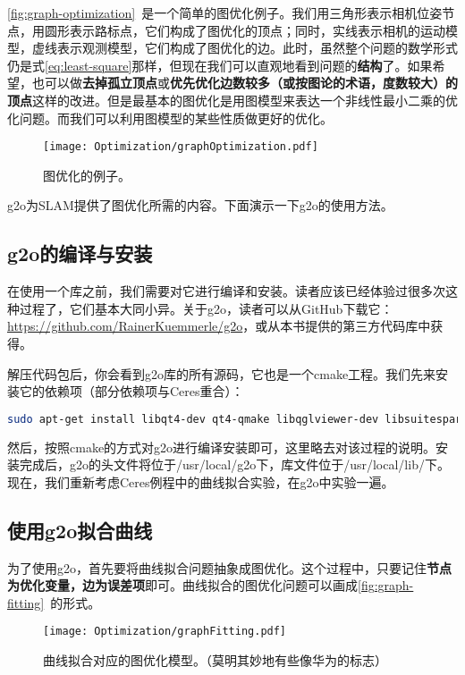 \autoref{fig:graph-optimization}~是一个简单的图优化例子。我们用三角形表示相机位姿节点，用圆形表示路标点，它们构成了图优化的顶点；同时，实线表示相机的运动模型，虚线表示观测模型，它们构成了图优化的边。此时，虽然整个问题的数学形式仍是式\eqref{eq:least-square}那样，但现在我们可以直观地看到问题的\textbf{结构}了。如果希望，也可以做\textbf{去掉孤立顶点}或\textbf{优先优化边数较多（或按图论的术语，度数较大）的顶点}这样的改进。但是最基本的图优化是用图模型来表达一个非线性最小二乘的优化问题。而我们可以利用图模型的某些性质做更好的优化。

\begin{figure}[!ht]
	\centering
	\texttt{[image: Optimization/graphOptimization.pdf]}
	\caption{图优化的例子。}
	\label{fig:graph-optimization}
\end{figure}

g2o为SLAM提供了图优化所需的内容。下面演示一下g2o的使用方法。

\subsection{g2o的编译与安装}
在使用一个库之前，我们需要对它进行编译和安装。读者应该已经体验过很多次这种过程了，它们基本大同小异。关于g2o，读者可以从GitHub下载它：\url{https://github.com/RainerKuemmerle/g2o}，或从本书提供的第三方代码库中获得。

解压代码包后，你会看到g2o库的所有源码，它也是一个cmake工程。我们先来安装它的依赖项（部分依赖项与Ceres重合）：

\begin{lstlisting}[language=sh]
sudo apt-get install libqt4-dev qt4-qmake libqglviewer-dev libsuitesparse-dev libcxsparse3.1.2 libcholmod-dev
\end{lstlisting}

然后，按照cmake的方式对g2o进行编译安装即可，这里略去对该过程的说明。安装完成后，g2o的头文件将位于/usr/local/g2o下，库文件位于/usr/local/lib/下。现在，我们重新考虑Ceres例程中的曲线拟合实验，在g2o中实验一遍。

\clearpage

\subsection{使用g2o拟合曲线}
为了使用g2o，首先要将曲线拟合问题抽象成图优化。这个过程中，只要记住\textbf{节点为优化变量，边为误差项}即可。曲线拟合的图优化问题可以画成\autoref{fig:graph-fitting}~的形式。

\begin{figure}[!ht]
	\centering
	\texttt{[image: Optimization/graphFitting.pdf]}
	\caption{曲线拟合对应的图优化模型。（莫明其妙地有些像华为的标志）}
	\label{fig:graph-fitting}
\end{figure}

